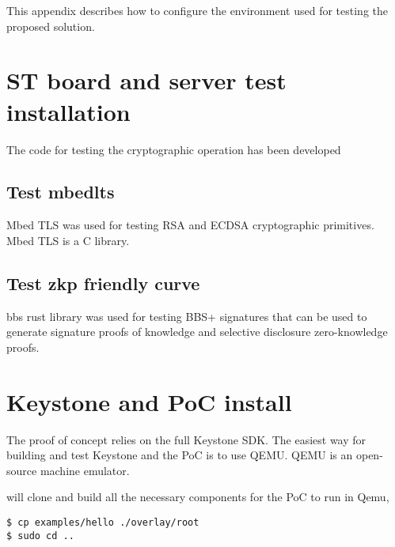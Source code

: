 
This appendix describes how to configure the environment used for testing the proposed solution.
\section{ST board and server test installation}
The code for testing the cryptographic operation has been developed 
\subsection*{Test mbedlts}
Mbed TLS was used for testing RSA and ECDSA cryptographic primitives. Mbed TLS is a C library.  

\subsection*{Test zkp friendly curve }
bbs rust library was used for testing BBS+ signatures that can be used to generate signature proofs of knowledge and selective disclosure zero-knowledge proofs.

 
\section{Keystone and PoC install}

The proof of concept relies on the full Keystone SDK. The easiest way for building and test Keystone and the PoC is to use QEMU. QEMU is an open-source machine emulator.

 will clone and build all the necessary components for the PoC to run in Qemu,
\begin{lstlisting}
$ cp examples/hello ./overlay/root
$ sudo cd ..
\end{lstlisting}